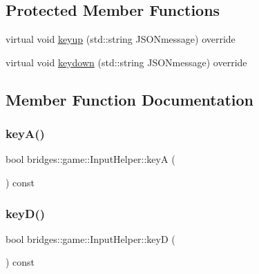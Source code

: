 \subsection*{Protected Member Functions}
\begin{DoxyCompactItemize}
\item 
virtual void \hyperlink{classbridges_1_1game_1_1_input_helper_aa847f19c6f68ebbb63d73802abfcd9a0}{keyup} (std\+::string J\+S\+O\+Nmessage) override
\item 
virtual void \hyperlink{classbridges_1_1game_1_1_input_helper_aac75c2b1abf28afa4acaf730e925f301}{keydown} (std\+::string J\+S\+O\+Nmessage) override
\end{DoxyCompactItemize}


\subsection{Member Function Documentation}
\mbox{\label{classbridges_1_1game_1_1_input_helper_a168770e762b33e32597f9f7294082d9b}} 
\subsubsection{\texorpdfstring{key\+A()}{keyA()}}
{\footnotesize\ttfamily bool bridges\+::game\+::\+Input\+Helper\+::keyA (\begin{DoxyParamCaption}{ }\end{DoxyParamCaption}) const\hspace{0.3cm}{\ttfamily [inline]}}

\mbox{\label{classbridges_1_1game_1_1_input_helper_af7247d84254d706e3a309db2f4c20e9b}} 
\subsubsection{\texorpdfstring{key\+D()}{keyD()}}
{\footnotesize\ttfamily bool bridges\+::game\+::\+Input\+Helper\+::keyD (\begin{DoxyParamCaption}{ }\end{DoxyParamCaption}) const\hspace{0.3cm}{\ttfamily [inline]}}

